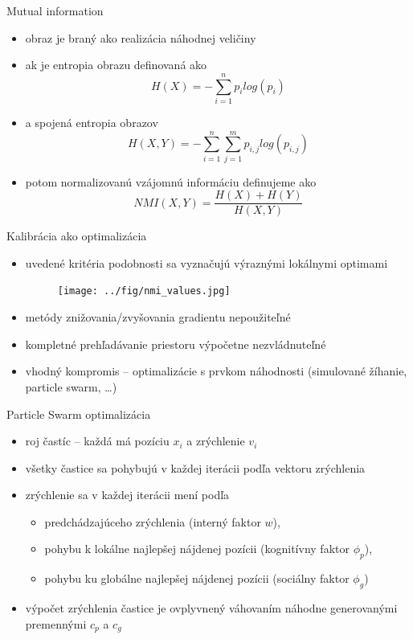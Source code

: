 \documentclass[pdf]{beamer}
\begin{document}
	\begin{frame}{Mutual information}
		\begin{itemize}
			\item obraz je braný ako realizácia náhodnej veličiny
			\item ak je entropia obrazu definovaná ako 
			$$ H(X) = - \sum\limits_{i=1}^n p_i log(p_i) $$
			\item a spojená entropia obrazov 
			$$ H(X,Y) = - \sum\limits_{i=1}^n \sum\limits_{j=1}^m p_{i,j} log(p_{i,j}) $$
			\item potom normalizovanú vzájomnú informáciu definujeme ako
			$$ NMI(X,Y) = \dfrac{H(X) + H(Y)}{H(X,Y)} $$
		\end{itemize}
	\end{frame}
	
	\begin{frame}{Kalibrácia ako optimalizácia}
		\begin{itemize}
			\item uvedené kritéria podobnosti sa vyznačujú výraznými lokálnymi optimami
				\begin{figure}[h]
					\center
					\texttt{[image: ../fig/nmi\_values.jpg]}
				\end{figure}
			\item metódy znižovania/zvyšovania gradientu nepoužiteľné
			\item kompletné prehľadávanie priestoru výpočetne nezvládnuteľné
			\item vhodný kompromis -- optimalizácie s prvkom náhodnosti (simulované žíhanie, particle swarm, \ldots)
		\end{itemize}
	\end{frame}
	
	\begin{frame}{Particle Swarm optimalizácia}
		\begin{itemize}
			\item roj častíc -- každá má pozíciu $x_i$ a zrýchlenie $v_i$
			\item všetky častice sa pohybujú v každej iterácii podľa vektoru zrýchlenia
			\item zrýchlenie sa v každej iterácii mení podľa
			\begin{itemize}
				\item predchádzajúceho zrýchlenia (interný faktor $w$), 
				\item pohybu k lokálne najlepšej nájdenej pozícii (kognitívny faktor $\phi_p$),
				\item pohybu ku globálne najlepšej nájdenej pozícii (sociálny faktor $\phi_g$)
			\end{itemize}
			\item výpočet zrýchlenia častice je ovplyvnený váhovaním náhodne generovanými premennými $c_p$ a $c_g$
		\end{itemize}	
	\end{frame}
\end{document}
